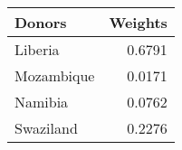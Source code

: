 \begin{tabular}{lr}
\toprule
    Donors &  Weights \\
\midrule
   Liberia &   0.6791 \\
Mozambique &   0.0171 \\
   Namibia &   0.0762 \\
 Swaziland &   0.2276 \\
\bottomrule
\end{tabular}
